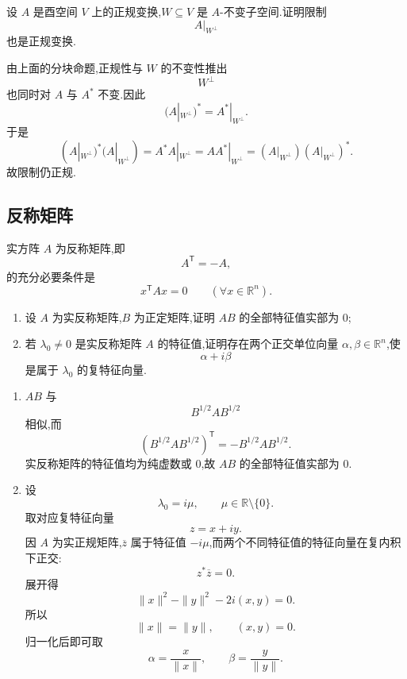 \begin{example}
设 $A$ 是酉空间 $V$ 上的正规变换,$W\subseteq V$ 是 $A$-不变子空间.证明限制
\[
A|_{W^\perp}
\]
也是正规变换.
\end{example}
\exampleblank

\begin{solution}
由上面的分块命题,正规性与 $W$ 的不变性推出
\[
W^\perp
\]
也同时对 $A$ 与 $A^*$ 不变.因此
\[
(A|_{W^\perp})^*=A^*|_{W^\perp}.
\]
于是
\[
(A|_{W^\perp})^*(A|_{W^\perp})
=
A^*A|_{W^\perp}
=
AA^*|_{W^\perp}
=
(A|_{W^\perp})(A|_{W^\perp})^*.
\]
故限制仍正规.
\end{solution}


\subsection{反称矩阵}

\begin{proposition}[\marktwostar]
实方阵 $A$ 为反称矩阵,即
\[
A^{\mathsf T}=-A,
\]
的充分必要条件是
\[
x^{\mathsf T}Ax=0
\qquad
(\forall x\in\mathbb{R}^n).
\]
\end{proposition}


\begin{example}
\begin{enumerate}
    \item 设 $A$ 为实反称矩阵,$B$ 为正定矩阵,证明 $AB$ 的全部特征值实部为 $0$;
    \item 若 $\lambda_0\neq0$ 是实反称矩阵 $A$ 的特征值,证明存在两个正交单位向量 $\alpha,\beta\in\mathbb{R}^n$,使
    \[
    \alpha+i\beta
    \]
    是属于 $\lambda_0$ 的复特征向量.
\end{enumerate}
\end{example}
\exampleblank

\begin{solution}
\leavevmode
\begin{enumerate}
    \item $AB$ 与
    \[
    B^{1/2}AB^{1/2}
    \]
    相似,而
    \[
    (B^{1/2}AB^{1/2})^{\mathsf T}
    =
    -B^{1/2}AB^{1/2}.
    \]
    实反称矩阵的特征值均为纯虚数或 $0$,故 $AB$ 的全部特征值实部为 $0$.

    \item 设
    \[
    \lambda_0=i\mu,
    \qquad \mu\in\mathbb{R}\setminus\{0\}.
    \]
    取对应复特征向量
    \[
    z=x+iy.
    \]
    因 $A$ 为实正规矩阵,$\overline z$ 属于特征值 $-i\mu$,而两个不同特征值的特征向量在复内积下正交:
    \[
    z^*\overline z=0.
    \]
    展开得
    \[
    \|x\|^2-\|y\|^2-2i(x,y)=0.
    \]
    所以
    \[
    \|x\|=\|y\|,
    \qquad
    (x,y)=0.
    \]
    归一化后即可取
    \[
    \alpha=\dfrac{x}{\|x\|},
    \qquad
    \beta=\dfrac{y}{\|y\|}.
    \]
\end{enumerate}
\end{solution}


